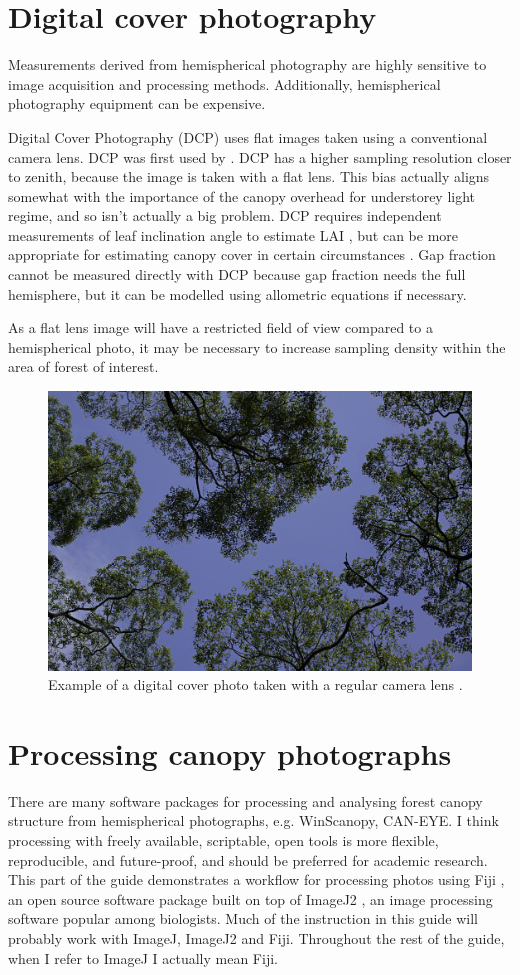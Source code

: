 \documentclass[11pt,a4paper]{article}
\begin{document}
\section{Digital cover photography}

Measurements derived from hemispherical photography are highly sensitive to image acquisition and processing methods. Additionally, hemispherical photography equipment can be expensive.

Digital Cover Photography (DCP) uses flat images taken using a conventional camera lens. DCP was first used by \citet{Macfarlane2007a}. DCP has a higher sampling resolution closer to zenith, because the image is taken with a flat lens. This bias actually aligns somewhat with the importance of the canopy overhead for understorey light regime, and so isn't actually a big problem. DCP requires independent measurements of leaf inclination angle to estimate LAI \citep{Ryu2010}, but can be more appropriate for estimating canopy cover in certain circumstances \citep{Pekin2009}. Gap fraction cannot be measured directly with DCP because gap fraction needs the full hemisphere, but it can be modelled using allometric equations if necessary.

As a flat lens image will have a restricted field of view compared to a hemispherical photo, it may be necessary to increase sampling density within the area of forest of interest. 

\begin{figure}[H]
	\includegraphics[width=0.6\linewidth]{dcp}
	\caption{Example of a digital cover photo taken with a regular camera lens \citep{dcp2010}.}
	\label{dcp}
\end{figure}

\section{Processing canopy photographs}

There are many software packages for processing and analysing forest canopy structure from hemispherical photographs, e.g. WinScanopy, CAN-EYE. I think processing with freely available, scriptable, open tools is more flexible, reproducible, and future-proof, and should be preferred for academic research. This part of the guide demonstrates a workflow for processing photos using Fiji \citep{Schindelin2012}, an open source software package built on top of ImageJ2 \citep{Rueden2017}, an image processing software popular among biologists. Much of the instruction in this guide will probably work with ImageJ, ImageJ2 and Fiji. Throughout the rest of the guide, when I refer to ImageJ I actually mean Fiji.
\end{document}
